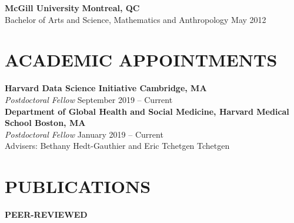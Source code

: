 \documentclass[12pt]{article}
\begin{document}
\textbf{McGill University} \hfill \hfill \textbf{Montreal, QC} \\
Bachelor of Arts and Science, Mathematics and Anthropology  \hfill \hfill May 2012 


\section*{\textbf{{\large A}CADEMIC {\large A}PPOINTMENTS }}

\textbf{Harvard Data Science Initiative \hfill \hfill Cambridge, MA} \\
\textit{Postdoctoral Fellow}  \hfill \hfill September 2019 -- Current \\

\textbf{Department of Global Health and Social Medicine, Harvard Medical School \hfill \hfill Boston, MA} \\
\textit{Postdoctoral Fellow} \hfill \hfill January 2019 -- Current \\
Advisers: Bethany Hedt-Gauthier and Eric Tchetgen Tchetgen 

\section*{\textbf{{\large P}{UBLICATIONS}}}

\noindent \textbf{PEER-REVIEWED}
\end{document}
